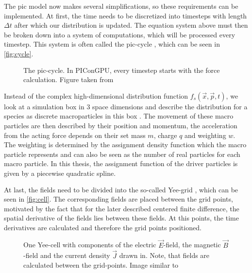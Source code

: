 \documentclass[bachelor_thesis]{subfiles}
\begin{document}
The \gls{pic} model now makes several simplifications, so these requirements can be implemented.
At first, the time needs to be discretized into timesteps with length $\Delta t$ after which our distribution is updated. The equation system above must then be broken down into a system of computations, which will be processed every timestep.
This system is often called the \gls{pic}-cycle \cite{Huebl2019}, which can be seen in \autoref{fig:cycle}.

\begin{figure}
	\centering
	\resizebox{0.8\textwidth}{!}{}
	\caption{The \gls{pic}-cycle. In PIConGPU, every timestep starts with the force calculation. Figure taken from \cite{Pausch2019}}
	\label{fig:cycle}
\end{figure}

Instead of the complex high-dimensional distribution function $f_s(\vec{x}, \vec{p}, t)$, we look at a simulation box in 3 space dimensions and describe the distribution for a species as discrete macroparticles in this box \cite{Burau2010}.
The movement of these macro particles are then described by their position and momentum, the acceleration from the acting force depends on their set mass $m$, charge $q$ and weighting $w$.
The weighting is determined by the assignment density function which the macro particle represents and can also be seen as the number of real particles for each macro particle.
In this thesis, the assignment function of the driver particles is given by a piecewise quadratic spline.

At last, the fields need to be divided into the so-called Yee-grid \cite{Yee1966}, which can be seen in \autoref{fig:cell}. The corresponding fields are placed between the grid points, motivated by the fact that for the later described centered finite difference, 
the spatial derivative of the fields lies between these fields. At this points, the time derivatives are calculated and therefore the grid points positioned.

\begin{figure}
	\centering
	\resizebox{0.8\textwidth}{!}{}
	\caption{One Yee-cell with components of the electric $\vec{E}$-field, the magnetic $\vec{B}$-field and the current density $\vec{J}$ drawn in. Note, that fields are calculated between the grid-points. Image similar to \cite{PICRepo}}
	\label{fig:cell}
\end{figure}
\end{document}
